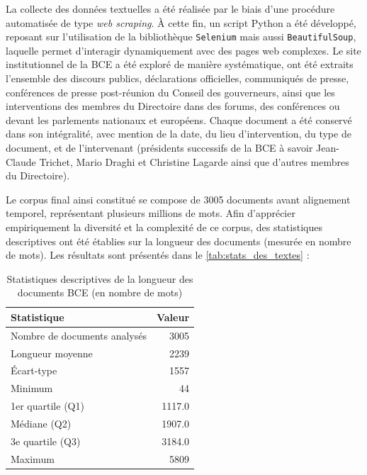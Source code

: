 La collecte des données textuelles a été réalisée par le biais d’une procédure automatisée de type \textit{web scraping}. À cette fin, un script Python a été développé, reposant sur l’utilisation de la bibliothèque \texttt{Selenium} mais aussi \texttt{BeautifulSoup}, laquelle permet d’interagir dynamiquement avec des pages web complexes. Le site institutionnel de la BCE a été exploré de manière systématique, ont été extraits l’ensemble des discours publics, déclarations officielles, communiqués de presse, conférences de presse post-réunion du Conseil des gouverneurs, ainsi que les interventions des membres du Directoire dans des forums, des conférences ou devant les parlements nationaux et européens. Chaque document a été conservé dans son intégralité, avec mention de la date, du lieu d’intervention, du type de document, et de l’intervenant (présidents successifs de la BCE à savoir Jean-Claude Trichet, Mario Draghi et Christine Lagarde ainsi que d’autres membres du Directoire).

Le corpus final ainsi constitué se compose de 3005 documents avant alignement temporel, représentant plusieurs millions de mots. Afin d’apprécier empiriquement la diversité et la complexité de ce corpus, des statistiques descriptives ont été établies sur la longueur des documents (mesurée en nombre de mots). Les résultats sont présentés dans le \autoref{tab:stats_des_textes} :

\begin{table}[H]
\centering
\begin{tabular}{lr}
\toprule
\textbf{Statistique} & \textbf{Valeur} \\
\midrule
Nombre de documents analysés & 3005 \\
Longueur moyenne             & 2239 \\
Écart-type                   & 1557 \\
Minimum                      & 44 \\
1er quartile (Q1)            & 1117.0 \\
Médiane (Q2)                 & 1907.0 \\
3e quartile (Q3)             & 3184.0 \\
Maximum                      & 5809 \\
\bottomrule
\end{tabular}
\caption{Statistiques descriptives de la longueur des documents BCE (en nombre de mots)}
\label{tab:stats_des_textes}
\end{table}

